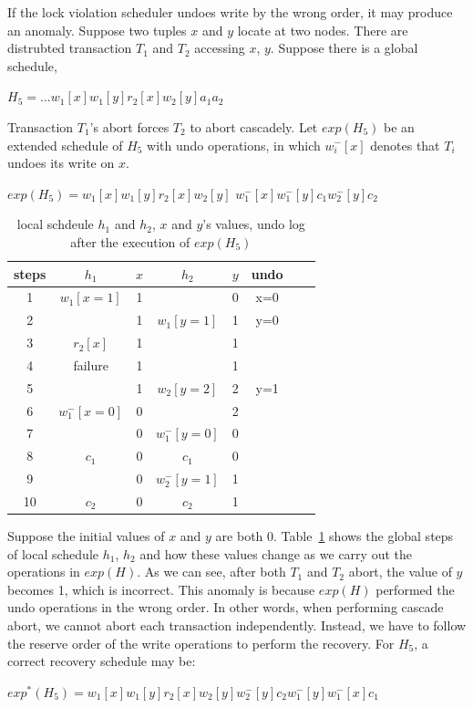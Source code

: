 \documentclass[conference]{IEEEtran}
\begin{document}
If the lock violation scheduler undoes write by the wrong order, it may produce an anomaly.
Suppose two tuples $x$ and $y$ locate at two nodes.
There are distrubted transaction $T_1$ and $T_2$ accessing $x$, $y$.
Suppose there is a global schedule,

\begin{center}
${H_5 = ...w_1[x]w_1[y]r_2[x]w_2[y]a_1a_2}$
\end{center}

Transaction ${T_1}$'s abort forces ${T_2}$ to abort cascadely.
Let ${exp(H_5)}$ be an extended schedule of $H_5$ with undo operations,
in which ${w^-_i[x]}$ denotes that ${T_i}$ undoes its write on ${x}$.

\begin{center}
  ${exp(H_5) =  w_1[x]w_1[y]r_2[x] w_2[y]}$
  ${w^-_1[x]w^-_1[y]  c_1 w^-_2[y]c_2}$
\end{center}


\begin{table}[tbp]
  \centering
  \caption{local schdeule $h_1$ and $h_2$, $x$ and $y$'s values, undo log after the execution of ${exp(H_5)}$}
  \begin{tabular}{|c|c|c|c|c|c|c|c|}
  \hline
steps & $h_1$ & $x$ & $h_2$ & $y$ & undo   \\
  \hline
  \hline
 1& $w_1[x=1]$ & 1 & &  0 & x=0  \\
  \hline
  2& & 1 & $w_1[y=1]$ & 1 & y=0   \\
  \hline
3 & $r_2[x]$ & 1 & & 1 &    \\

  \hline
 4 & failure  & 1 & & 1 &  \\
  \hline
 5& & 1 &   $w_2[y=2]$ & 2 & y=1  \\
  \hline
6  & $w^-_1[x=0]$ & 0 && 2 &   \\
  \hline
7 & & 0 & $w^-_1[y=0]$ & 0 &   \\
  \hline


8  & $c_1$ & 0 &$c_1$& 0 &   \\
  \hline
9 & & 0 &  $w^-_2[y=1]$& 1 &   \\
  \hline
10 & $c_2$ & 0 &$c_2$& 1 &  \\
  \hline
  \end{tabular}

\label{tbl:x_y_vlues}
\end{table}


Suppose the initial values of ${x}$ and ${y}$ are both 0.
Table~\ref{tbl:x_y_vlues} shows the global steps of local schedule ${h_1}$, ${h_2}$ and how these values change as we carry out the operations in $exp(H)$.
As we can see, after both ${T_1}$ and ${T_2}$ abort, the value of ${y}$ becomes 1, which is incorrect.
This anomaly is because $exp(H)$ performed the undo operations in the wrong order.
In other words, when performing cascade abort, we cannot abort each transaction independently.
Instead, we have to follow the reserve order of the write operations to perform the recovery.
For ${H_5}$, a correct recovery schedule may be:
\begin{center}
${exp^*(H_5) = w_1[x]w_1[y]r_2[x]w_2[y]w^-_2[y]c_2w^-_1[y]w^-_1[x]c_1}$
\end{center}
\end{document}
